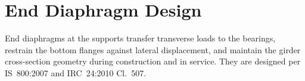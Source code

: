 \documentclass[12pt,a4paper]{report}
\numberwithin{table}{chapter}
\numberwithin{figure}{chapter}
\begin{document}
\section{End Diaphragm Design}
\label{sec:end-diaphragm}

End diaphragms at the supports transfer transverse loads to the bearings, restrain the bottom flanges against lateral displacement, and maintain the girder cross-section geometry during construction and in service. They are designed per IS~800:2007 and IRC~24:2010 Cl.~507.

\vspace{1em}

\vspace{0.4em}
\noindent
\setlength{\tabcolsep}{4pt}
\setlength{\LTleft}{0pt}
\setlength{\LTright}{\fill}
\end{document}
